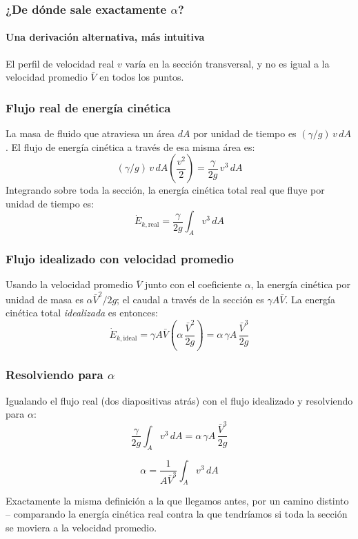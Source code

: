 \documentclass{ltx-talk}
\begin{document}
\begin{frame}
  \frametitle{¿De dónde sale exactamente $\alpha$?}
  \framesubtitle{Una derivación alternativa, más intuitiva}
  \begin{center}
  \end{center}
  El perfil de velocidad real $v$ varía en la sección transversal, y no
  es igual a la velocidad promedio $\bar V$ en todos los puntos.
\end{frame}

\begin{frame}
  \frametitle{Flujo real de energía cinética}
  La masa de fluido que atraviesa un área $dA$ por unidad de tiempo es
  $(\gamma/g)\,v\,dA$. El flujo de energía cinética a través de esa
  misma área es:
  \[
    (\gamma/g)\,v\,dA\left(\frac{v^2}{2}\right) = \frac{\gamma}{2g}\,v^3\,dA
  \]
  Integrando sobre toda la sección, la energía cinética total real que
  fluye por unidad de tiempo es:
  \[
    \dot{E}_{k,\text{real}} = \frac{\gamma}{2g}\int_A v^3\,dA
  \]
\end{frame}

\begin{frame}
  \frametitle{Flujo idealizado con velocidad promedio}
  Usando la velocidad promedio $\bar V$ junto con el coeficiente
  $\alpha$, la energía cinética por unidad de masa es
  $\alpha \bar V^2/2g$; el caudal a través de la sección es
  $\gamma A \bar V$. La energía cinética total \emph{idealizada} es
  entonces:
  \[
    \dot{E}_{k,\text{ideal}} = \gamma A \bar V \left(\alpha\,\frac{\bar V^2}{2g}\right)
      = \alpha\,\gamma A\,\frac{\bar V^3}{2g}
  \]
\end{frame}

\begin{frame}
  \frametitle{Resolviendo para $\alpha$}
  Igualando el flujo real (dos diapositivas atrás) con el flujo
  idealizado y resolviendo para $\alpha$:
  \[
    \frac{\gamma}{2g}\int_A v^3\,dA = \alpha\,\gamma A\,\frac{\bar V^3}{2g}
  \]
  \begin{icvwarning}
  \[
    \alpha = \frac{1}{A\bar V^3}\int_A v^3\,dA
  \]
  \end{icvwarning}
  Exactamente la misma definición a la que llegamos antes, por un
  camino distinto -- comparando la energía cinética real contra la que
  tendríamos si toda la sección se moviera a la velocidad promedio.
\end{frame}
\end{document}
